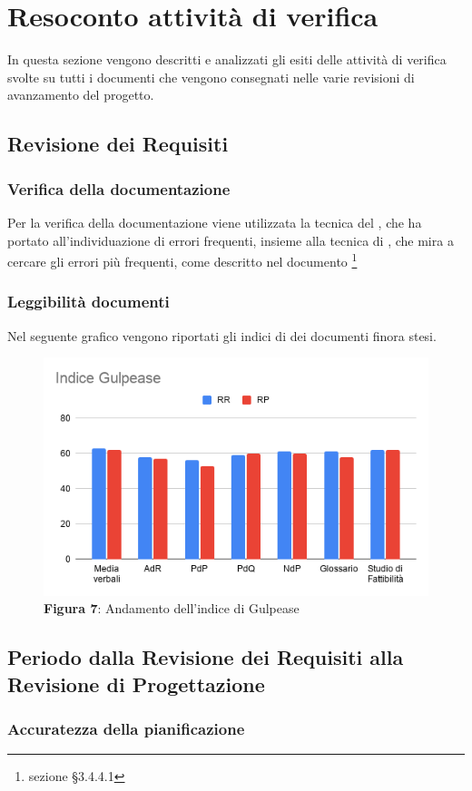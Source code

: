 \section{Resoconto attività di verifica}
In questa sezione vengono descritti e analizzati gli esiti delle attività di verifica svolte su tutti i documenti che vengono consegnati nelle varie revisioni di avanzamento del progetto.
	\subsection{Revisione dei Requisiti}
		\subsubsection{Verifica della documentazione}
		Per la verifica della documentazione viene utilizzata la tecnica del , che ha portato all'individuazione di errori frequenti, insieme alla tecnica di , che mira a cercare gli errori più frequenti, come descritto nel documento \footnote{sezione §3.4.4.1}
		\subsubsection{Leggibilità documenti}
		Nel seguente grafico vengono riportati gli indici di  dei documenti finora stesi.
		\begin{figure}[H]
			\centering
			\includegraphics[width=0.7\linewidth]{res/images/IndiceGulpease.png}
			\caption*{\textbf{Figura 7}: Andamento dell'indice di Gulpease}
			\label{fig:Figura7}
		\end{figure}
	\subsection{Periodo dalla Revisione dei Requisiti alla Revisione di Progettazione}
		\subsubsection{Accuratezza della pianificazione}
